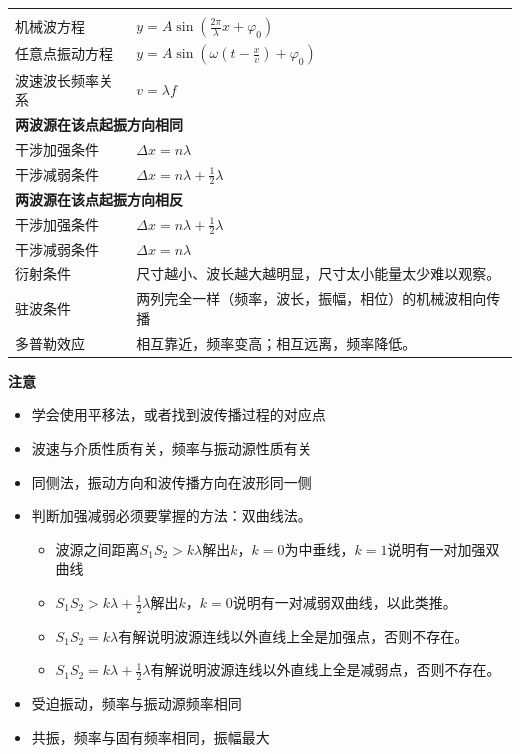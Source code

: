 \documentclass{cheatsheet}
\begin{document}
\begin{tabularx}{\columnwidth}{XX}
	\rowcolor{blue!30}
	\multicolumn{2}{l}{\parbox[c][2.5\ht\strutbox][c]{0.9\columnwidth}{\Large 机械波}} \\
	机械波方程    & $y=A\sin(\frac{2\pi}{\lambda}x+\varphi_0)$ \\
	任意点振动方程  & $y=A\sin(\omega (t-\frac{x}{v})+\varphi_0)$ \\
	波速波长频率关系 & $v=\lambda f$  \\
	\multicolumn{2}{l}{\textbf{两波源在该点起振方向相同}} \\
	干涉加强条件   & $\Delta x=n\lambda$ \\
	干涉减弱条件   & $\Delta x=n\lambda+\frac12\lambda$  \\
	\multicolumn{2}{l}{\textbf{两波源在该点起振方向相反}} \\
	干涉加强条件   & $\Delta x=n\lambda+\frac12\lambda$ \\
	干涉减弱条件   & $\Delta x=n\lambda$ \\
	衍射条件     & 尺寸越小、波长越大越明显，尺寸太小能量太少难以观察。\\
	驻波条件     & 两列完全一样（频率，波长，振幅，相位）的机械波相向传播\\
	多普勒效应    & 相互靠近，频率变高；相互远离，频率降低。\\
\end{tabularx}
\textbf{注意}
\begin{itemize}
	\item 学会使用平移法，或者找到波传播过程的对应点
	\item 波速与介质性质有关，频率与振动源性质有关
	\item 同侧法，振动方向和波传播方向在波形同一侧
	\item 判断加强减弱必须要掌握的方法：双曲线法。
	\begin{itemize}
		\item [] 波源之间距离$S_1S_2>k\lambda$解出$k$，$k=0$为中垂线，$k=1$说明有一对加强双曲线
		\item [] $S_1S_2>k\lambda+\frac12\lambda$解出$k$，$k=0$说明有一对减弱双曲线，以此类推。
		\item [] $S_1S_2=k\lambda$有解说明波源连线以外直线上全是加强点，否则不存在。\item [] $S_1S_2=k\lambda+\frac12\lambda$有解说明波源连线以外直线上全是减弱点，否则不存在。
	\end{itemize}
	\item 受迫振动，频率与振动源频率相同
	\item 共振，频率与固有频率相同，振幅最大
\end{itemize}
\end{document}
